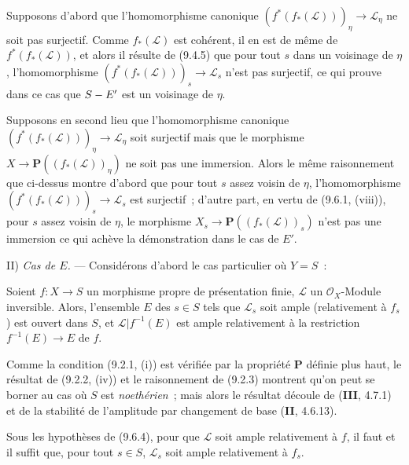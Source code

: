 Supposons d'abord que l'homomorphisme canonique
$(f^*(f_*(\mathcal L)))_\eta\to\mathcal L_\eta$ ne soit pas surjectif. Comme
$f_*(\mathcal L)$ est cohérent, il en est de même de $f^*(f_*(\mathcal L))$,
et alors il résulte de (9.4.5) que pour tout $s$ dans un voisinage de $\eta$,
l'homomorphisme $(f^*(f_*(\mathcal L)))_s\to\mathcal L_s$ n'est pas
surjectif, ce qui prouve dans ce cas que $S- E'$ est un voisinage de $\eta$.

Supposons en second lieu que l'homomorphisme canonique
$(f^*(f_*(\mathcal L)))_\eta\to\mathcal L_\eta$ soit surjectif mais que le
morphisme $X\to\mathbf P((f_*(\mathcal L))_\eta)$ ne soit pas une
immersion. Alors le même raisonnement que ci-dessus montre d'abord que pour
tout $s$ assez voisin de $\eta$, l'homomorphisme
$(f^*(f_*(\mathcal L)))_s\to\mathcal L_s$ est surjectif~; d'autre part, en
vertu de (9.6.1, (viii)), pour $s$ assez voisin de $\eta$, le morphisme
$X_s\to\mathbf P((f_*(\mathcal L))_s)$ n'est pas une immersion ce qui achève
la démonstration dans le cas de $E'$.

II) \emph{Cas de $E$.} --- Considérons d'abord le cas particulier où $Y=S$~:

\begin{corollary}[9.6.4]
\label{IV.9.6.4-fr}
Soient $f:X\to S$ un morphisme \textup{propre} de présentation finie, $\mathcal L$ un
$\mathcal O_X$-Module inversible. Alors, l'ensemble $E$ des $s\in S$ tels que
$\mathcal L_s$ soit ample (relativement à $f_s$) est ouvert dans $S$, et
$\mathcal L|f^{-1}(E)$ est ample relativement à la restriction
$f^{-1}(E)\to E$ de $f$.
\end{corollary}

Comme la condition (9.2.1, (i)) est vérifiée par la propriété $\boldsymbol{P}$ définie plus
haut, le résultat de (9.2.2, (iv)) et le raisonnement de (9.2.3) montrent qu'on
peut se borner au cas où $S$ est \emph{noethérien}~; mais alors le résultat
découle de (\textbf{III}, 4.7.1) et de la stabilité de l'amplitude par
changement de base (\textbf{II}, 4.6.13).

\begin{corollary}[9.6.5]
\label{IV.9.6.5-fr}
Sous les hypothèses de (9.6.4), pour que $\mathcal L$ soit ample relativement
à $f$, il faut et il suffit que, pour tout $s\in S$, $\mathcal L_s$ soit ample
relativement à $f_s$.
\end{corollary}

